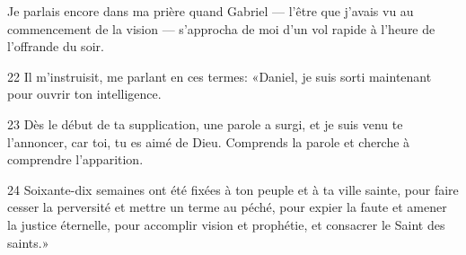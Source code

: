 Je parlais encore dans ma prière quand Gabriel --- l’être que j’avais vu au commencement de la vision --- s’approcha de moi d’un vol rapide à l’heure de l’offrande du soir.

22 Il m’instruisit, me parlant en ces termes: «Daniel, je suis sorti maintenant pour ouvrir ton intelligence.

23 Dès le début de ta supplication, une parole a surgi, et je suis venu te l’annoncer, car toi, tu es aimé de Dieu. Comprends la parole et cherche à comprendre l’apparition.

24 Soixante-dix semaines ont été fixées à ton peuple et à ta ville sainte, pour faire cesser la perversité et mettre un terme au péché, pour expier la faute et amener la justice éternelle, pour accomplir vision et prophétie, et consacrer le Saint des saints.»
